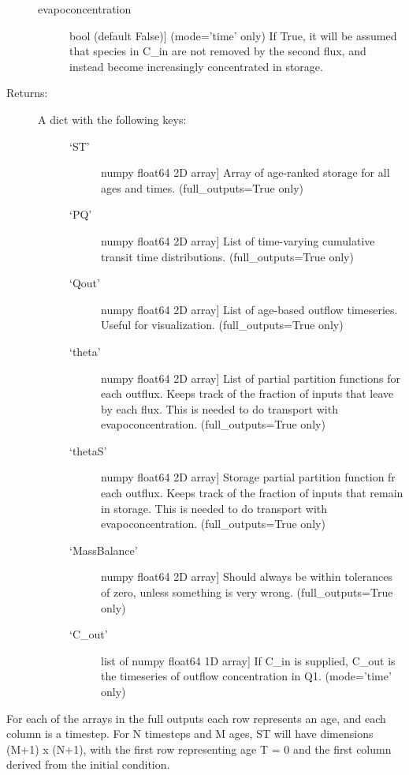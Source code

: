 \documentclass[letterpaper,10pt,english]{sphinxmanual}
\begin{document}
\begin{fulllineitems}
\begin{description}
\begin{description}
\item[{evapoconcentration}] \leavevmode{[}bool (default False){]}
(mode='time' only) If True, it will be assumed that species in C\_in are not removed 
by the second flux, and instead become increasingly concentrated in
storage.

\end{description}

\item[{Returns:}] \leavevmode\begin{description}
\item[{A dict with the following keys:}] \leavevmode\begin{description}
\item[{`ST'}] \leavevmode{[}numpy float64 2D array{]}
Array of age-ranked storage for all ages and times. (full\_outputs=True only)

\item[{`PQ'}] \leavevmode{[}numpy float64 2D array{]}
List of time-varying cumulative transit time distributions. (full\_outputs=True only)

\item[{`Qout'}] \leavevmode{[}numpy float64 2D array{]}
List of age-based outflow timeseries. Useful for visualization. (full\_outputs=True only)

\item[{`theta'}] \leavevmode{[}numpy float64 2D array{]}
List of partial partition functions for each outflux. Keeps track of the
fraction of inputs that leave by each flux. This is needed to do
transport with evapoconcentration. (full\_outputs=True only)

\item[{`thetaS'}] \leavevmode{[}numpy float64 2D array{]}
Storage partial partition function fr each outflux. Keeps track of the
fraction of inputs that remain in storage. This is needed to do
transport with evapoconcentration. (full\_outputs=True only)

\item[{`MassBalance'}] \leavevmode{[}numpy float64 2D array{]}
Should always be within tolerances of zero, unless something is very
wrong. (full\_outputs=True only)

\item[{`C\_out'}] \leavevmode{[}list of numpy float64 1D array{]}
If C\_in is supplied, C\_out is the timeseries of outflow concentration 
in Q1. (mode='time' only)

\end{description}

\end{description}

\end{description}

For each of the arrays in the full outputs each row represents an age, and each
column is a timestep. For N timesteps and M ages, ST will have dimensions
(M+1) x (N+1), with the first row representing age T = 0 and the first
column derived from the initial condition.

\end{fulllineitems}
\end{document}

